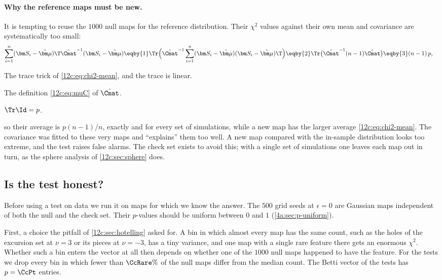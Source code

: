 \paragraph{Why the reference maps must be new.} It is tempting to reuse the $1000$ null maps for the reference
distribution. Their $\chi^2$ values against their own mean and covariance are systematically too small:
\begin{align}
  \sum_{i=1}^n(\bm S_i-\hat{\bm\mu})\T\hat\Cmat^{-1}(\bm S_i-\hat{\bm\mu})
  &\eqby{1}\Tr\Bigl(\hat\Cmat^{-1}\sum_{i=1}^n(\bm S_i-\hat{\bm\mu})(\bm S_i-\hat{\bm\mu})\T\Bigr)
   \eqby{2}\Tr\bigl(\hat\Cmat^{-1}(n-1)\hat\Cmat\bigr)
   \eqby{3}(n-1)\,p ,
  \nonumber
\end{align}
\begin{explain}
  \item The trace trick of \eqref{12c:eq:chi2-mean}, and the trace is linear.
  \item The definition \eqref{12c:eq:muC} of $\hat\Cmat$.
  \item $\Tr\Id=p$.
\end{explain}
so their average is $p(n-1)/n$, exactly and for every set of simulations, while a new map has the larger average
\eqref{12c:eq:chi2-mean}. The covariance was fitted to these very maps and ``explains'' them too well. A new map compared with
the in-sample distribution looks too extreme, and the test raises false alarms. The check set exists to avoid this; with a
single set of simulations one leaves each map out in turn, as the sphere analysis of \cref{12c:sec:sphere} does.

\subsection{Is the test honest?}
\label{12c:sec:calib}

Before using a test on data we run it on maps for which we know the answer. The $500$ grid seeds at $\epsilon=0$ are Gaussian
maps independent of both the null and the check set. Their $p$-values should be uniform between $0$ and $1$
(\cref{4a:sec:p-uniform}).

First, a choice the pitfall of \cref{12c:sec:hotelling} asked for. A bin in which almost every map has the same count, such as
the holes of the excursion set at $\nu=3$ or its pieces at $\nu=-3$, has a tiny variance, and one map with a single rare feature there gets an enormous $\chi^2$. Whether such
a bin enters the vector at all then depends on whether one of the $1000$ null maps happened to have the feature. For the tests
we drop every bin in which fewer than $\CcRare\%$ of the null maps differ from the median count. The Betti vector of the tests
has $p=\CcPt$ entries.

